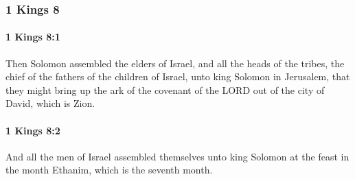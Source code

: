 	\subsubsection{1 Kings 8} %
		\label{1KINGS-8}

		\paragraph{1 Kings 8:1} %
			\label{1KINGS-8-1}

			Then Solomon assembled the elders of Israel, and all the heads of the tribes, the chief of the fathers of the children of Israel, unto king Solomon in Jerusalem, that they might bring up the ark of the covenant of the LORD out of the city of David, which is Zion.


		\paragraph{1 Kings 8:2} %
			\label{1KINGS-8-2}

			And all the men of Israel assembled themselves unto king Solomon at the feast in the month Ethanim, which is the seventh month.

